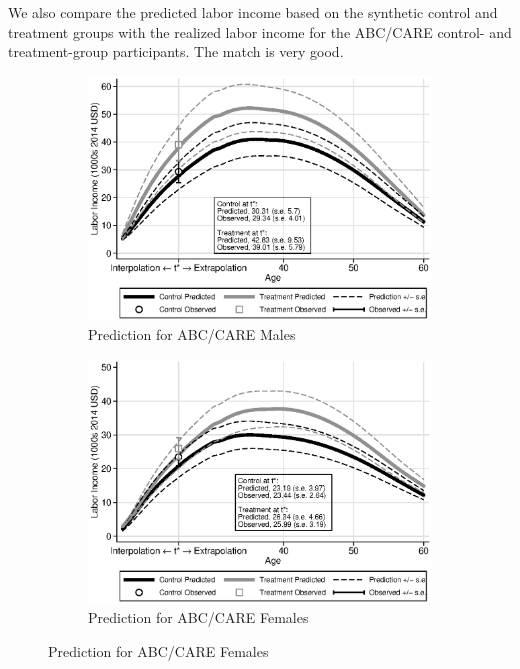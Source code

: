 We also compare the predicted labor income based on the synthetic control and treatment groups with the realized labor income for the ABC/CARE control- and treatment-group participants. The match is very good.

\begin{figure}
\centering
\caption{Labor Income Profile Predictions}\label{fig:labor-income-profiles}
\begin{subfigure}[h]{0.5\textwidth}
		\centering
		\caption{Prediction for ABC/CARE Males} \label{fig:labor-income-profilesc}
		\includegraphics[width=\textwidth]{output/labor_25-65_pset1_mset3_male.eps}
\end{subfigure}%
\begin{subfigure}[h]{0.5\textwidth}
		\centering
		\caption{Prediction for ABC/CARE Females} \label{fig:labor-income-profilesa}
		\includegraphics[width=\textwidth]{output/labor_25-65_pset1_mset3_female.eps}

\end{subfigure}
\end{figure}
